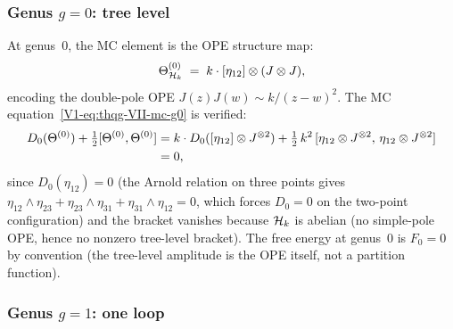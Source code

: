 \subsubsection{Genus $g = 0$: tree level}

\begin{computation}
At genus~$0$, the MC element is the OPE structure map:
\begin{equation}%
\Theta^{(0)}_{\cH_k}
\;=\;
k \cdot [\eta_{12}] \otimes (J \otimes J),
\end{equation}
encoding the double-pole OPE $J(z)J(w) \sim k/(z-w)^2$. The MC
equation~\eqref{V1-eq:thqg-VII-mc-g0} is verified:
\begin{align}
D_0(\Theta^{(0)}) + \tfrac{1}{2}[\Theta^{(0)},\Theta^{(0)}]
&= k \cdot D_0([\eta_{12}] \otimes J^{\otimes 2})
 + \tfrac{1}{2}\,k^2\,[\eta_{12} \otimes J^{\otimes 2},\,
 \eta_{12} \otimes J^{\otimes 2}]\notag\\
&= 0,%
\end{align}
since $D_0(\eta_{12}) = 0$ (the Arnold relation on three
points gives $\eta_{12} \wedge \eta_{23} + \eta_{23} \wedge
\eta_{31} + \eta_{31} \wedge \eta_{12} = 0$, which forces
$D_0 = 0$ on the two-point configuration) and the bracket
vanishes because $\mathcal{H}_k$ is abelian (no simple-pole OPE, hence
no nonzero tree-level bracket).
The free energy at genus~$0$ is $F_0 = 0$ by convention
(the tree-level amplitude is the OPE itself, not a partition
function).
\end{computation}

\subsubsection{Genus $g = 1$: one loop}

